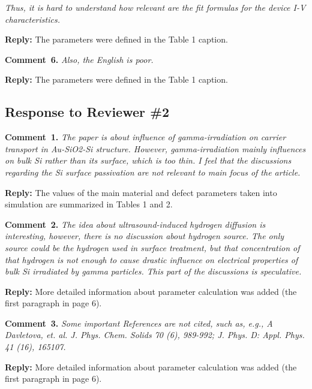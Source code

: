 \documentclass[aip,jap,preprint]{revtex4-1}
\begin{document}
\emph{Thus, it is hard to understand how relevant are the fit formulas for the device I-V characteristics.}


\noindent
\textcolor[rgb]{0.51,0.00,0.00}{\textbf{Reply:}}
The parameters were defined in the Table 1 caption.

\noindent
\textcolor[rgb]{0.00,0.50,1.00}{\textbf{Comment~6.}}
\emph{Also, the English is poor.}


\noindent
\textcolor[rgb]{0.51,0.00,0.00}{\textbf{Reply:}}
The parameters were defined in the Table 1 caption.


\subsection*{Response to Reviewer \#2 }

\noindent
\textcolor[rgb]{0.00,0.50,1.00}{\textbf{Comment~1.}}
\emph{ The paper is about influence of gamma-irradiation on carrier transport in Au-SiO2-Si structure. However, gamma-irradiation mainly influences on bulk Si rather than its surface, which is too thin. I feel that the discussions regarding the Si surface passivation are not relevant to main focus of the article.}



\noindent
\textcolor[rgb]{0.51,0.00,0.00}{\textbf{Reply:}}
The values of the main material and defect parameters taken into simulation are summarized in Tables 1 and 2.



\noindent
\textcolor[rgb]{0.00,0.50,1.00}{\textbf{Comment~2.}}
\emph{ The idea about ultrasound-induced hydrogen diffusion is interesting, however, there is no discussion about hydrogen source. The only source could be the hydrogen used in surface treatment, but that concentration of that hydrogen is not enough to cause drastic influence on electrical properties of bulk Si irradiated by gamma particles. This part of the discussions is speculative.}

\noindent
\textcolor[rgb]{0.51,0.00,0.00}{\textbf{Reply:}}
More detailed information about parameter calculation was added (the first paragraph in page 6).



\noindent
\textcolor[rgb]{0.00,0.50,1.00}{\textbf{Comment~3.}}
\emph{ Some important References are not cited, such as, e.g., A Davletova, et. al. J. Phys. Chem. Solids 70 (6), 989-992; J. Phys. D: Appl. Phys. 41 (16), 165107.}

\noindent
\textcolor[rgb]{0.51,0.00,0.00}{\textbf{Reply:}}
More detailed information about parameter calculation was added (the first paragraph in page 6).
\end{document}
